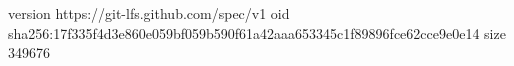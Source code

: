 version https://git-lfs.github.com/spec/v1
oid sha256:17f335f4d3e860e059bf059b590f61a42aaa653345c1f89896fce62cce9e0e14
size 349676
